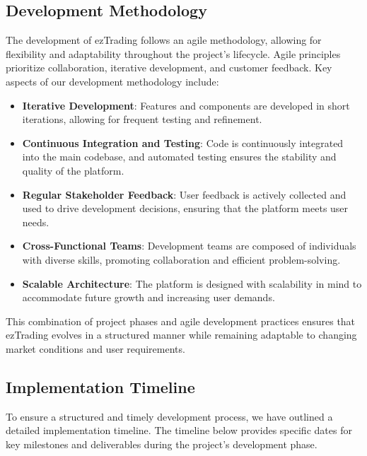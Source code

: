 \subsection{Development Methodology}

The development of ezTrading follows an agile methodology, allowing for flexibility and adaptability throughout the project's lifecycle. Agile principles prioritize collaboration, iterative development, and customer feedback. Key aspects of our development methodology include:

\begin{itemize}
  \item \textbf{Iterative Development}: Features and components are developed in short iterations, allowing for frequent testing and refinement.

  \item \textbf{Continuous Integration and Testing}: Code is continuously integrated into the main codebase, and automated testing ensures the stability and quality of the platform.

  \item \textbf{Regular Stakeholder Feedback}: User feedback is actively collected and used to drive development decisions, ensuring that the platform meets user needs.

  \item \textbf{Cross-Functional Teams}: Development teams are composed of individuals with diverse skills, promoting collaboration and efficient problem-solving.

  \item \textbf{Scalable Architecture}: The platform is designed with scalability in mind to accommodate future growth and increasing user demands.

\end{itemize}

This combination of project phases and agile development practices ensures that ezTrading evolves in a structured manner while remaining adaptable to changing market conditions and user requirements.

\subsection{Implementation Timeline}
\label{sec:implementation-timeline}

To ensure a structured and timely development process, we have outlined a detailed implementation timeline. The timeline below provides specific dates for key milestones and deliverables during the project's development phase.

